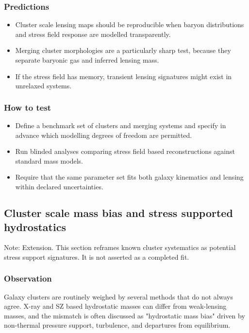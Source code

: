 \documentclass[11pt,a4paper]{article}
\begin{document}
\subsubsection{Predictions}
\begin{itemize}
  \item Cluster scale lensing maps should be reproducible when baryon distributions and stress field response are modelled transparently.
  \item Merging cluster morphologies are a particularly sharp test, because they separate baryonic gas and inferred lensing mass.
  \item If the stress field has memory, transient lensing signatures might exist in unrelaxed systems.
\end{itemize}

\subsubsection{How to test}
\begin{itemize}
  \item Define a benchmark set of clusters and merging systems and specify in advance which modelling degrees of freedom are permitted.
  \item Run blinded analyses comparing stress field based reconstructions against standard mass models.
  \item Require that the same parameter set fits both galaxy kinematics and lensing within declared uncertainties.
\end{itemize}

\subsection{Cluster scale mass bias and stress supported hydrostatics}
\begin{mdframed}[linecolor=accent,linewidth=0.5pt,backgroundcolor=callout-bg,leftline=true,rightline=true,topline=true,bottomline=true,innerleftmargin=8pt,innerrightmargin=8pt,innertopmargin=6pt,innerbottommargin=6pt]
Note: Extension. This section reframes known cluster systematics as potential stress support signatures. It is not asserted as a completed fit.
\end{mdframed}

\subsubsection{Observation}
Galaxy clusters are routinely weighed by several methods that do not always agree. X-ray and SZ based hydrostatic masses can differ from weak-lensing masses,
and the mismatch is often discussed as "hydrostatic mass bias" driven by non-thermal pressure support, turbulence, and departures from equilibrium.
\end{document}
